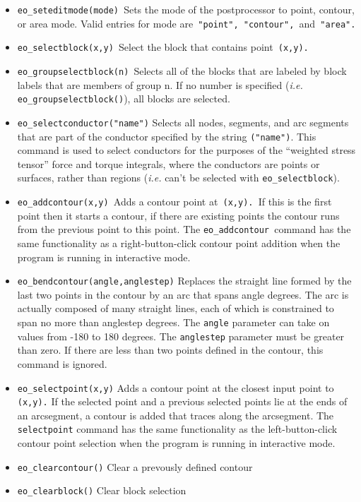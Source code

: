 \begin{itemize}
\item \texttt{eo\_seteditmode(mode) }Sets the mode of the postprocessor to point,
contour, or area mode. Valid entries for mode are\texttt{ "point",
"contour", }and\texttt{ "area". }

\item \texttt{eo\_selectblock(x,y) }Select the block that contains point\texttt{
(x,y).}

\item \texttt{eo\_groupselectblock(n) }Selects all of the blocks that are labeled by
block labels that are members of group n. If no number is specified
({\em i.e.} \texttt{eo\_groupselectblock()}), all blocks are selected.

\item \texttt{eo\_selectconductor("name")} Selects all nodes, segments, and arc
segments that are part of the conductor specified by the string
\texttt{("name")}. This command is used to select conductors for the
purposes of the ``weighted stress tensor'' force and torque
integrals, where the conductors are points or surfaces, rather than
regions ({\em i.e.} can't be selected with \texttt{eo\_selectblock}).

\item \texttt{eo\_addcontour(x,y) }Adds a contour point at\texttt{ (x,y). }If this is
the first point then it starts a contour, if there are existing
points the contour runs from the previous point to this point. The
\texttt{eo\_addcontour }command has the same functionality as a
right-button-click contour point addition when the program is
running in interactive mode.\texttt{ }

\item \texttt{eo\_bendcontour(angle,anglestep)} Replaces the straight line formed by
the last two points in the contour by an arc that spans angle
degrees. The arc is actually composed of many straight lines, each
of which is constrained to span no more than anglestep degrees. The
\texttt{angle} parameter can take on values from -180 to 180
degrees. The \texttt{anglestep} parameter must be greater than
zero. If there are less than two points defined in the contour,
this command is ignored.

\item \texttt{eo\_selectpoint(x,y)} Adds a contour point at the closest input point to
\texttt{(x,y).} If the selected point and a previous selected points lie at
the ends of an arcsegment, a contour is added that traces along the
arcsegment. The \texttt{selectpoint} command has the same
functionality as the left-button-click contour point selection when
the program is running in interactive mode.

\item \texttt{eo\_clearcontour()} Clear a prevously defined contour

\item \texttt{eo\_clearblock()} Clear block selection
\end{itemize}



